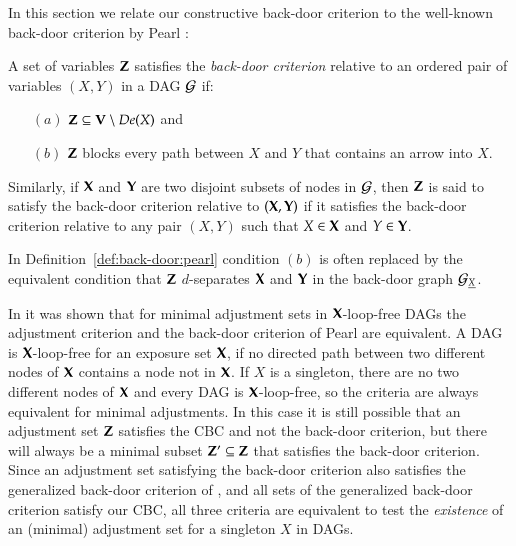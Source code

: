 In this section we relate our constructive back-door criterion to the well-known 
back-door criterion by Pearl \cite{Pearl2009}:
\begin{definition}\label{def:back-door:pearl}
A set of variables ${\bf Z}$ satisfies the \emph{back-door criterion} relative to an ordered pair of variables $(X, Y)$ in a DAG ${\cal G}$  if:
\begin{enumerate}
  \item[$(a)$] ${\bf Z} \subseteq {\bf V} \setminus \textit{De}(X)$ and 
  \item[$(b)$] ${\bf Z}$ blocks every path between $X$ and $Y$ that contains an arrow into $X$.
\end{enumerate}
Similarly, if ${\bf X}$ and ${\bf Y}$ are two disjoint subsets of nodes in ${\cal G}$, then ${\bf Z}$ is said to satisfy the back-door criterion relative to $({\bf X},{\bf Y})$ if it satisfies the back-door criterion relative to any pair $(X,Y)$ such that $X\in{\bf X}$ and $Y\in{\bf Y}$.
\end{definition}

In Definition~\ref{def:back-door:pearl} condition $(b)$ is often replaced by the equivalent condition that ${\bf Z}$ $d$-separates ${\bf X}$ and ${\bf Y}$ in the back-door graph ${\cal G}_{\underline{X}}$.

In \cite{TextorLiskiewicz2011} it was shown that for minimal adjustment sets in ${\bf X}$-loop-free DAGs the adjustment criterion and the back-door criterion of Pearl are equivalent. A DAG is ${\bf X}$-loop-free for an exposure set ${\bf X}$, if no directed path between two different nodes of ${\bf X}$ contains a node not in ${\bf X}$. If $X$ is a singleton, there are no two different nodes of ${\bf X}$ and every DAG is ${\bf X}$-loop-free, so the criteria are always equivalent for minimal adjustments. In this case it is still possible that an adjustment set ${\bf Z}$ satisfies the CBC and not the back-door criterion, but there will always be a minimal subset ${\bf Z}' \subseteq {\bf Z}$ that satisfies the back-door criterion. Since an adjustment set satisfying the back-door criterion also satisfies the generalized back-door criterion of \cite{Maathuis2013}, and all sets of the  generalized back-door criterion satisfy our CBC, all three criteria are equivalent to test the \emph{existence} of an (minimal) adjustment set for a singleton $X$ in DAGs.




